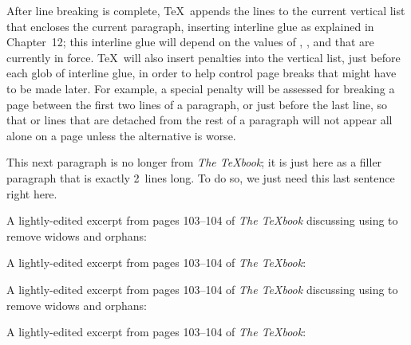 {    After line breaking is complete, \TeX\ appends the lines to the current vertical list that encloses the current paragraph, inserting interline glue as explained in Chapter~12; this interline glue will depend on the values of , , and  that are currently in force. \TeX\ will also insert penalties into the vertical list, just before each glob of interline glue, in order to help control page breaks that might have to be made later. For example, a special penalty will be assessed for breaking a page between the first two lines of a paragraph, or just before the last line, so that  or  lines that are detached from the rest of a paragraph will not appear all alone on a page unless the alternative is worse.

    This next paragraph is no longer from \emph{The \TeX{}book}; it is just here as a filler paragraph that is exactly 2~lines long. To do so, we just need this last sentence right here.
}

\def\widoworphantests{
    \noindent A lightly-edited excerpt from pages 103--104 of \emph{The \TeX{}book} discussing using \texcsname{looseness} to remove widows and orphans:

    \fillertext

    \pagebreakcommand

    \noindent A lightly-edited excerpt from pages 103--104 of \emph{The \TeX{}book}:

    \fillertext

    \pagebreakcommand
}

\lwcdisable
\widoworphantests

\lwcenable
\widoworphantests
